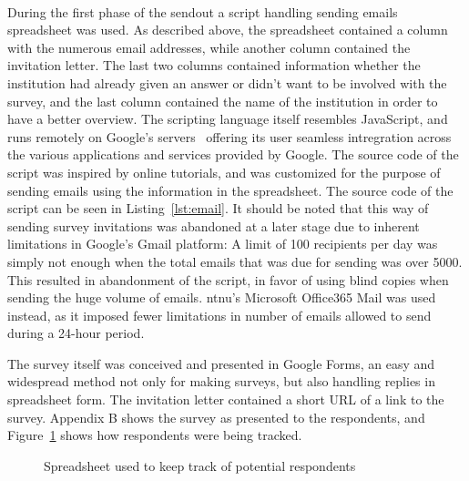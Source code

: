 \newline
\\
During the first phase of the sendout a script handling sending emails spreadsheet was used. As described above, the spreadsheet contained a column with the numerous email addresses, while another column contained the invitation letter. The last two columns contained information whether the institution had already given an answer or didn't want to be involved with the survey, and the last column contained the name of the institution in order to have a better overview. The scripting language itself resembles JavaScript, and runs remotely on Google's servers~\cite{google2016} offering its user seamless intregration across the various applications and services provided by Google. The source code of the script was inspired by online tutorials, and was customized for the purpose of sending emails using the information in the spreadsheet. The source code of the script can be seen in Listing~\ref{lst:email}. It should be noted that this way of sending survey invitations was abandoned at a later stage due to inherent limitations in Google's Gmail platform: A limit of 100 recipients per day was simply not enough when the total emails that was due for sending was over 5000. This resulted in abandonment of the script, in favor of using blind copies when sending the huge volume of emails. \gls{ntnu}'s Microsoft Office365 Mail was used instead, as it imposed fewer limitations in number of emails allowed to send during a 24-hour period.


The survey itself was conceived and presented in Google Forms, an easy and widespread method not only for making surveys, but also handling replies in spreadsheet form. The invitation letter contained a short URL of a link to the survey. Appendix B shows the survey as presented to the respondents, and Figure~\ref{fig:contactsheet} shows how respondents were being tracked.


\begin{figure}
    \centering
    \caption{Spreadsheet used to keep track of potential respondents}
    \label{fig:contactsheet}
\end{figure}

